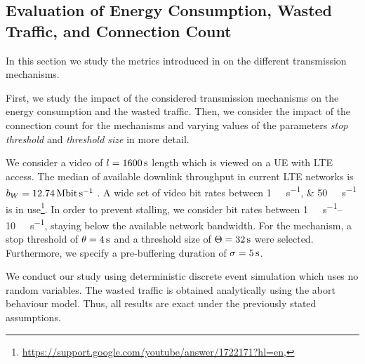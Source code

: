 \subsection{Evaluation of Energy Consumption, Wasted Traffic, and Connection Count}\label{sec:application:lte_video:numerical_evaluation}

In this section we study the metrics introduced in  on the different transmission mechanisms.

First, we study the impact of the considered transmission mechanisms on the energy consumption and the wasted traffic.
Then, we consider the impact of the connection count for the \streaming mechanisms and varying values of the parameters \emph{stop threshold} \bufferlower and \emph{threshold size} \buffersize in more detail.

We consider a video of \(l=\SI{1600}{\second}\) length which is viewed on a \gls{UE} with \gls{LTE} access.
The median of available downlink throughput in current \gls{LTE} networks is \(\bandwidth = \SI{12.74}{\mega\bit\per\second}\) \cite{Huang2012}.
A wide set of video bit rates between \SIlist{1;50}{\mega\bit\per\second} is in use\footnote{\url{https://support.google.com/youtube/answer/1722171?hl=en}, \accessed}.
In order to prevent stalling, we consider bit rates between \SIrange{1}{10}{\mega\bit\per\second}, staying below the available network bandwidth.
For the \streaming mechanism, a stop threshold of \(\theta = \SI{4}{\second}\) and a threshold size of \(\Theta = \SI{32}{\second}\) were selected.
Furthermore, we specify a pre-buffering duration of \(\sigma = \SI{5}{\second}\).

We conduct our study using deterministic discrete event simulation which uses no random variables.
The wasted traffic is obtained analytically using the abort behaviour model.
Thus, all results are exact under the previously stated assumptions.

